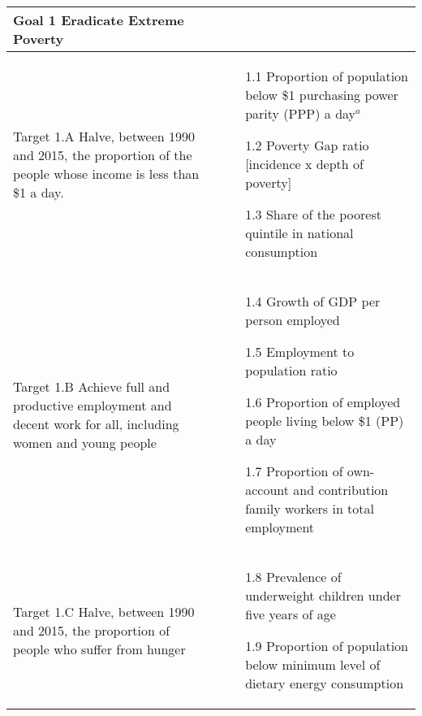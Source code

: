 \documentclass{article}
\begin{document}
\begin{center}
\begin{tabularx}{\textwidth}[t]{XX}
\arrayrulecolor{green}\hline
\textbf{\textcolor{myGreen}{Goal 1 Eradicate Extreme Poverty}} & \\
\hline
Target 1.A Halve, between 1990 and 2015, the proportion of the people whose income is less than \$1 a day. & 
\begin{minipage}[t]{\linewidth}%
\begin{itemize}
\item[1.1] Proportion of population below \$1 purchasing power parity (PPP) a day$^a$
\item[1.2] Poverty Gap ratio [incidence x depth of poverty]
\item[1.3] Share of the poorest quintile in national consumption
\end{itemize} 
\end{minipage}\\

\arrayrulecolor{black}\hline

Target 1.B Achieve full and productive employment and decent work for all, including women and young people &
\begin{minipage}[t]{\linewidth}%
\begin{itemize}
\item[1.4] Growth of GDP per person employed 
\item[1.5] Employment to population ratio
\item[1.6] Proportion of employed people living below \$1 (PP) a day
\item[1.7] Proportion of own-account and contribution family workers in total employment
\end{itemize} 
\end{minipage}\\

\hline

Target 1.C Halve, between 1990 and 2015, the proportion of people who suffer from hunger &
\begin{minipage}[t]{\linewidth}%
\begin{itemize}
\item[1.8] Prevalence of underweight children under five years of age
\item[1.9] Proportion of population below minimum level of dietary energy consumption
\end{itemize}
\end{minipage}\\


\end{tabularx}
\end{center}
\end{document}
